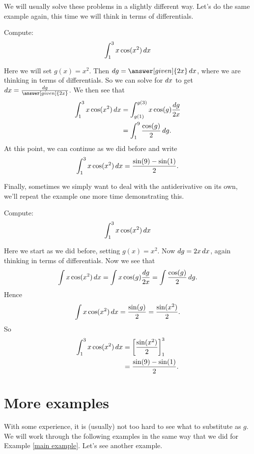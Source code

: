 \documentclass{ximera}
\begin{document}
We will usually solve these problems in a slightly different
way. Let's do the same example again, this time we will think in terms
of differentials.

\begin{example}\label{main example}
Compute:
\[
\int_1^3 x\cos(x^2)\mathop{}\!d x
\]
\begin{explanation}
Here we will set $g(x) = x^2$. Then $\d g = \answer[given]{2x} \d x$,
where we are thinking in terms of differentials. So we can solve for
$\mathop{}\!d x$ to get $\d x = \frac{\d g}{\answer[given]{2x}}$.  We then see
that
\begin{align*}
  \int_1^3 x \cos(x^2) \mathop{}\!d x &= \int_{g(1)}^{g(3)} x \cos(g) \frac{\mathop{}\!d g}{2x}\\
  &= \int_{1}^{9} \frac{\cos(g)}{2}\mathop{}\!d g .
\end{align*}
At this point, we can continue as we did before and write
\[
\int_1^3 x\cos(x^2)\mathop{}\!d x= \frac{\sin(9) -\sin(1)}{2}.
\]
\end{explanation}
\end{example}

Finally, sometimes we simply want to deal with the antiderivative on
its own, we'll repeat the example one more time demonstrating this.

\begin{example}
Compute:
\[
\int_1^3 x\cos(x^2)\mathop{}\!d x
\]
\begin{explanation}
Here we start as we did before, setting $g(x)=x^2$. Now $\mathop{}\!d g =  2x \mathop{}\!d x$,
again thinking in terms of differentials. Now we see that
\[
\int x \cos(x^2) \mathop{}\!d x = \int x \cos(g) \frac{\mathop{}\!d g}{2x} = \int \frac{\cos(g)}{2}\mathop{}\!d g .
\]
Hence 
\[
\int x\cos(x^2)\mathop{}\!d x = \frac{\sin(g)}{2} = \frac{\sin(x^2)}{2}.
\]
So
\begin{align*}
\int_1^3 x\cos(x^2)\mathop{}\!d x &=\bigg[ \frac{\sin(x^2)}{2} \bigg]_1^3\\
&= \frac{\sin(9) -\sin(1)}{2}.
\end{align*}
\end{explanation}
\end{example}

\section{More examples}

With some experience, it is (usually) not too hard to see what to
substitute as $g$.  We will work through the following examples in the
same way that we did for Example \ref{main example}. Let's see another
example.
\end{document}
